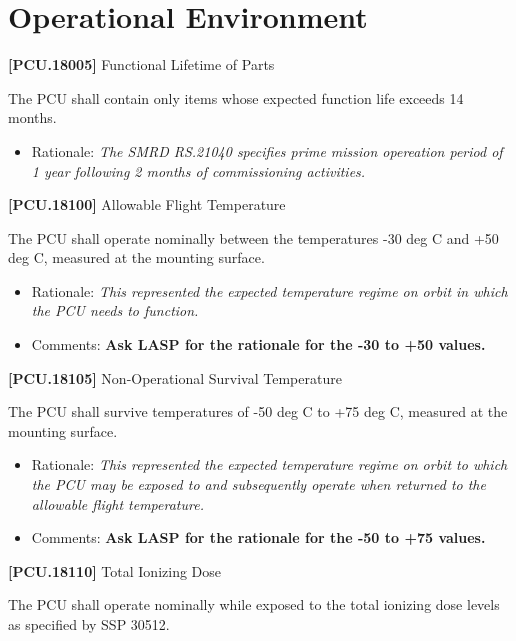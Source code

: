 \section{Operational Environment}
\label{operationalenvironment}

\textbf{[PCU.18005]} Functional Lifetime of Parts

The \gls{PCU} shall contain only items whose expected function life exceeds 14 months.

\begin{itemize}
\item{} Rationale: \emph{The SMRD RS.21040 specifies prime mission opereation period of 1 year following 2 months of commissioning activities.}

\end{itemize}

\textbf{[PCU.18100]} Allowable Flight Temperature

The \gls{PCU} shall operate nominally between the temperatures -30 deg C and +50 deg C, measured at the mounting surface.

\begin{itemize}
\item{} Rationale: \emph{This represented the expected temperature regime on orbit in which the PCU needs to function.}

\item{} Comments: \textbf{Ask LASP for the rationale for the -30 to +50 values.}

\end{itemize}

\textbf{[PCU.18105]} Non-Operational Survival Temperature

The \gls{PCU} shall survive temperatures of -50 deg C to +75 deg C, measured at the mounting surface.

\begin{itemize}
\item{} Rationale: \emph{This represented the expected temperature regime on orbit to which the PCU may be exposed to and subsequently operate when returned to the allowable flight temperature.}

\item{} Comments: \textbf{Ask LASP for the rationale for the -50 to +75 values.}

\end{itemize}

\textbf{[PCU.18110]} Total Ionizing Dose

The \gls{PCU} shall operate nominally while exposed to the total ionizing dose levels as specified by SSP 30512.

